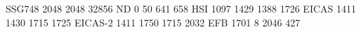 SSG748 2048 2048 32856
ND         0   50  641  658
HSI     1097 1429 1388 1726
EICAS   1411 1430 1715 1725
EICAS-2 1411 1750 1715 2032
EFB     1701    8 2046  427
